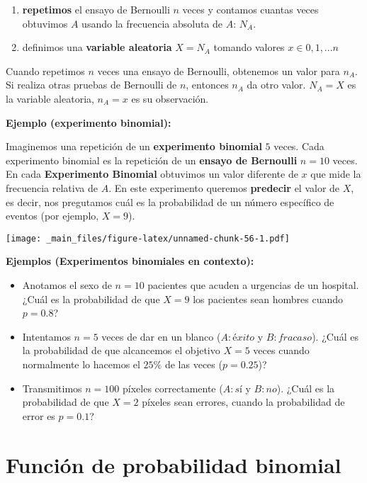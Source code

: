 \documentclass[
]{book}
\begin{document}
\begin{enumerate}
\def\labelenumi{\arabic{enumi})}
\item
  \textbf{repetimos} el ensayo de Bernoulli \(n\) veces y contamos cuantas veces obtuvimos \(A\) usando la frecuencia absoluta de \(A\): \(N_A\).
\item
  definimos una \textbf{variable aleatoria} \(X=N_A\) tomando valores \(x \in {0,1,...n}\)
\end{enumerate}

Cuando repetimos \(n\) veces una ensayo de Bernoulli, obtenemos un valor para \(n_A\). Si realiza otras pruebas de Bernoulli de \(n\), entonces \(n_A\) da otro valor. \(N_A=X\) es la variable aleatoria, \(n_A=x\) es su observación.

\textbf{Ejemplo (experimento binomial):}

Imaginemos una repetición de un \textbf{experimento binomial} \(5\) veces. Cada experimento binomial es la repetición de un \textbf{ensayo de Bernoulli} \(n=10\) veces. En cada \textbf{Experimento Binomial} obtuvimos un valor diferente de \(x\) que mide la frecuencia relativa de \(A\). En este experimento queremos \textbf{predecir} el valor de \(X\), es decir, nos pregutamos cuál es la probabilidad de un número específico de eventos (por ejemplo, \(X=9\)).

\texttt{[image: \_main\_files/figure-latex/unnamed-chunk-56-1.pdf]}

\textbf{Ejemplos (Experimentos binomiales en contexto):}

\begin{itemize}
\item
  Anotamos el sexo de \(n=10\) pacientes que acuden a urgencias de un hospital. ¿Cuál es la probabilidad de que \(X=9\) los pacientes sean hombres cuando \(p=0.8\)?
\item
  Intentamos \(n=5\) veces de dar en un blanco (\(A:éxito\) y \(B:fracaso\)). ¿Cuál es la probabilidad de que alcancemos el objetivo \(X=5\) veces cuando normalmente lo hacemos el \(25\%\) de las veces (\(p=0.25\))?
\item
  Transmitimos \(n=100\) píxeles correctamente (\(A:sí\) y \(B:no\)). ¿Cuál es la probabilidad de que \(X=2\) píxeles sean errores, cuando la probabilidad de error es \(p=0.1\)?
\end{itemize}

\hypertarget{funciuxf3n-de-probabilidad-binomial}{%
\section{Función de probabilidad binomial}\label{funciuxf3n-de-probabilidad-binomial}}
\end{document}
